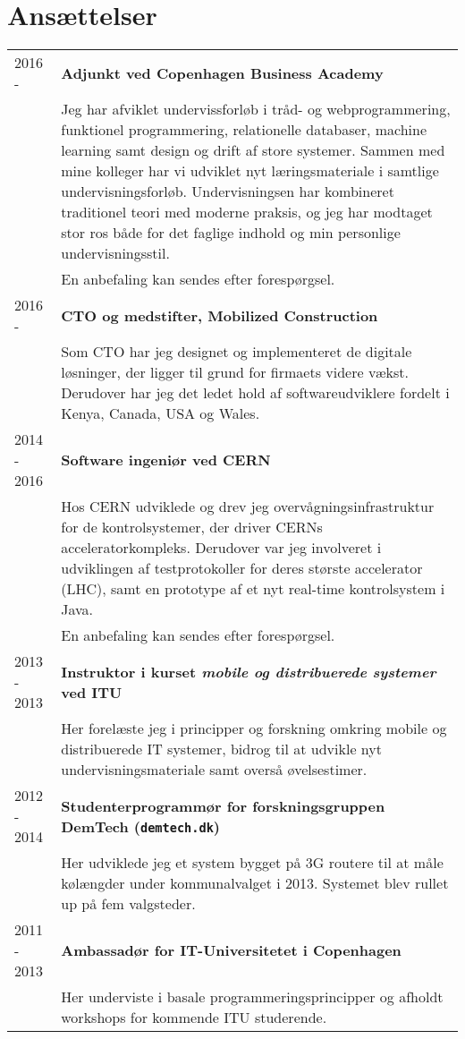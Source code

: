 \documentclass[12pt,a4paper,notitlepage]{article}
\begin{document}
\section*{Ansættelser}
\begin{tabularx}{\textwidth}{l X}
2016 -      & \textbf{Adjunkt ved Copenhagen Business Academy} \\
            & Jeg har afviklet undervissforløb i tråd- og webprogrammering,
              funktionel programmering, relationelle databaser, machine learning
              samt design og drift af store systemer. Sammen med mine kolleger
              har vi udviklet nyt læringsmateriale i samtlige undervisningsforløb.
              Undervisningsen har kombineret traditionel teori med
              moderne praksis, og jeg har modtaget stor ros både
              for det faglige indhold og min personlige undervisningsstil.\\
            & En anbefaling kan sendes efter forespørgsel. \\
2016 -      & \textbf{CTO og medstifter, Mobilized Construction} \\
            & Som CTO har
              jeg designet og implementeret de digitale løsninger, der ligger til
              grund for firmaets videre vækst. Derudover har jeg det ledet hold af
              softwareudviklere fordelt i Kenya, Canada, USA og Wales. \\
2014 - 2016 & \textbf{Software ingeniør ved CERN} \\
            & Hos CERN udviklede og drev jeg overvågningsinfrastruktur for
              de kontrolsystemer, der driver CERNs acceleratorkompleks.
              Derudover var jeg involveret i udviklingen af testprotokoller for
              deres største accelerator (LHC), samt en prototype af et nyt
              real-time kontrolsystem i Java. \\
            & En anbefaling kan sendes efter forespørgsel. \\
2013 - 2013 & \textbf{Instruktor i kurset \textit{mobile og distribuerede systemer} ved ITU} \\
            & Her forelæste jeg i principper og forskning omkring mobile og
              distribuerede IT systemer, bidrog til at udvikle nyt
              undervisningsmateriale samt overså øvelsestimer. \\
2012 - 2014 & \textbf{Studenterprogrammør for forskningsgruppen DemTech (\texttt{demtech.dk})} \\
            & Her udviklede jeg et system bygget på 3G routere til at måle
              kølængder under kommunalvalget i 2013. Systemet blev rullet up på
              fem valgsteder. \\
2011 - 2013 & \textbf{Ambassadør for IT-Universitetet i Copenhagen} \\
            & Her underviste i basale programmeringsprincipper og afholdt
              workshops for kommende ITU studerende.
\end{tabularx}
\end{document}
